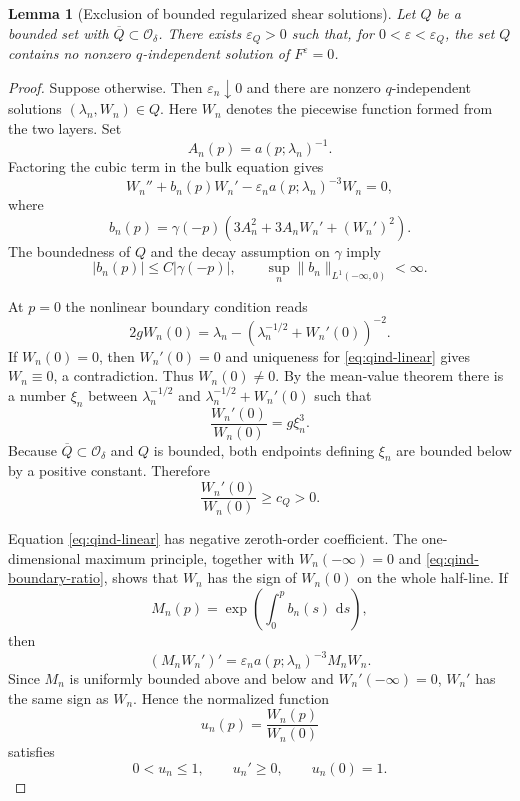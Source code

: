 \documentclass[11pt,reqno]{amsart}
\numberwithin{equation}{section}
\newtheorem{lemma}[theorem]{Lemma}
\newcommand{\dd}{\,\mathrm{d}}
\theoremstyle{definition}
\theoremstyle{remark}
\begin{document}
\begin{lemma}[Exclusion of bounded regularized shear solutions]
\label{lem:qind-approx}
Let $Q$ be a bounded set with $\overline Q\subset\mathcal O_\delta$.
There exists $\varepsilon_Q>0$ such that, for
$0<\varepsilon<\varepsilon_Q$, the set $Q$ contains no nonzero
$q$-independent solution of $F^\varepsilon=0$.
\end{lemma}
\begin{proof}
Suppose otherwise.  Then $\varepsilon_n\downarrow0$ and there are
nonzero $q$-independent solutions
$(\lambda_n,W_n)\in Q$.  Here $W_n$ denotes the piecewise function
formed from the two layers.  Set
\[
 A_n(p)=a(p;\lambda_n)^{-1}.
\]
Factoring the cubic term in the bulk equation gives
\begin{equation}\label{eq:qind-linear}
 W_n''+b_n(p)W_n'
 -\varepsilon_n a(p;\lambda_n)^{-3}W_n=0,
\end{equation}
where
\[
 b_n(p)=\gamma(-p)
 \left(3A_n^2+3A_nW_n'+(W_n')^2\right).
\]
The boundedness of $Q$ and the decay assumption on $\gamma$ imply
\[
 |b_n(p)|\leq C|\gamma(-p)|,
 \qquad
 \sup_n\|b_n\|_{L^1(-\infty,0)}<\infty.
\]

At $p=0$ the nonlinear boundary condition reads
\[
 2gW_n(0)=\lambda_n-
 \left(\lambda_n^{-1/2}+W_n'(0)\right)^{-2}.
\]
If $W_n(0)=0$, then $W_n'(0)=0$ and uniqueness for
\eqref{eq:qind-linear} gives $W_n\equiv0$, a contradiction.  Thus
$W_n(0)\neq0$.  By the mean-value theorem there is a number $\xi_n$
between $\lambda_n^{-1/2}$ and
$\lambda_n^{-1/2}+W_n'(0)$ such that
\begin{equation}\label{eq:qind-boundary-ratio}
 \frac{W_n'(0)}{W_n(0)}=g\xi_n^3.
\end{equation}
Because $\overline Q\subset\mathcal O_\delta$ and $Q$ is bounded,
both endpoints defining $\xi_n$ are bounded below by a positive
constant.  Therefore
\begin{equation}\label{eq:qind-ratio-lower}
 \frac{W_n'(0)}{W_n(0)}\geq c_Q>0.
\end{equation}

Equation \eqref{eq:qind-linear} has negative zeroth-order
coefficient.  The one-dimensional maximum principle, together with
$W_n(-\infty)=0$ and \eqref{eq:qind-boundary-ratio}, shows that
$W_n$ has the sign of $W_n(0)$ on the whole half-line.  If
\[
 M_n(p)=\exp\left(\int_0^p b_n(s)\,\dd s\right),
\]
then
\[
 (M_nW_n')'
 =\varepsilon_n a(p;\lambda_n)^{-3}M_nW_n.
\]
Since $M_n$ is uniformly bounded above and below and
$W_n'(-\infty)=0$, $W_n'$ has the same sign as $W_n$.  Hence the
normalized function
\[
 u_n(p)=\frac{W_n(p)}{W_n(0)}
\]
satisfies
\[
 0<u_n\leq1,\qquad u_n'\geq0,\qquad u_n(0)=1.
\]


\end{proof}
\end{document}
